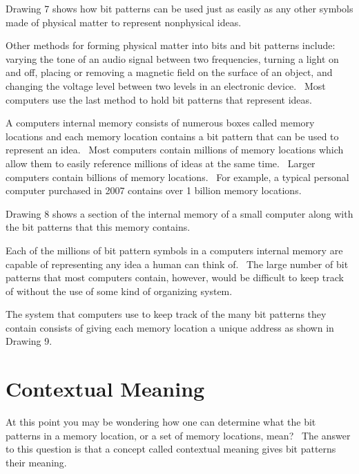 \documentclass[12pt,twoside]{book}
\begin{document}
\bigskip

Drawing 7 shows how bit patterns can be used just as easily as any other
symbols made of physical matter to represent nonphysical ideas.


\bigskip


\bigskip

Other methods for forming physical matter into bits and bit patterns
include: varying the tone of an audio signal between two frequencies,
turning a light on and off, placing or removing a magnetic field on the
surface of an object, and changing the voltage level between two levels
in an electronic device. \ Most computers use the last method to hold
bit patterns that represent ideas.


\bigskip

A computer{\textquotesingle}s internal memory consists of numerous
{\textquotedbl}boxes{\textquotedbl} called memory locations and each
memory location contains a bit pattern that can be used to represent an
idea. \ Most computers contain millions of memory locations which allow
them to easily reference millions of ideas at the same time. \ Larger
computers contain billions of memory locations. \ For example, a
typical personal computer purchased in 2007 contains over 1 billion
memory locations. \ 


\bigskip

Drawing 8 shows a section of the internal memory of a small computer
along with the bit patterns that this memory contains.


\bigskip


\bigskip

Each of the millions of bit pattern symbols in a
computer{\textquotesingle}s internal memory are capable of representing
any idea a human can think of. \ The large number of bit patterns that
most computers contain, however, would be difficult to keep track of
without the use of some kind of organizing system. \ 


\bigskip

The system that computers use to keep track of the many bit patterns
they contain consists of giving each memory location a unique address
as shown in Drawing 9.


\bigskip

\section[Contextual Meaning]{Contextual Meaning}
At this point you may be wondering {\textquotedbl}how one can determine
what the bit patterns in a memory location, or a set of memory
locations, mean?{\textquotedbl} \ The answer to this question is that a
concept called contextual meaning gives bit patterns their meaning.
\end{document}
